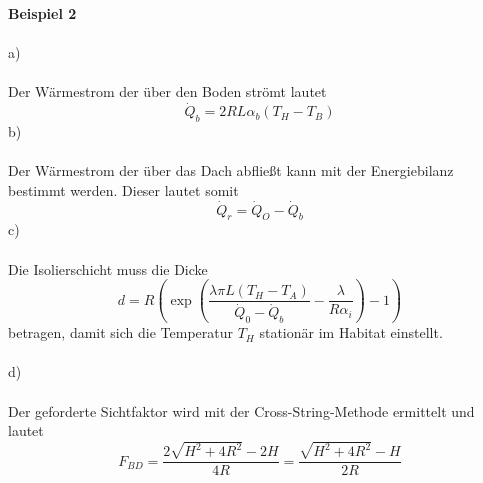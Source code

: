 \textbf{Beispiel 2}\\ \\
a) \\ \\
Der Wärmestrom der über den Boden strömt lautet
\[
	\dot{Q}_b = 2RL\alpha_b(T_H - T_B)
\]
b) \\ \\
Der Wärmestrom der über das Dach abfließt kann mit der Energiebilanz bestimmt werden. Dieser lautet somit
\[
	\dot{Q}_r = \dot{Q}_O - \dot{Q}_b
\]
c)\\ \\
Die Isolierschicht muss die Dicke
\[
	d = R\left(\exp\left(\frac{\lambda\pi L(T_H - T_A)}{\dot{Q}_0 - \dot{Q}_b} - \frac{\lambda}{R\alpha_i}\right) - 1\right)
\]
betragen, damit sich die Temperatur $T_H$ stationär im Habitat einstellt.\\ \\
d)\\ \\
Der geforderte Sichtfaktor wird mit der Cross-String-Methode ermittelt und lautet 
\[
	F_{BD} = \frac{2\sqrt{H^2 + 4R^2} - 2H}{4R} = \frac{\sqrt{H^2 + 4R^2} - H}{2R}
\]